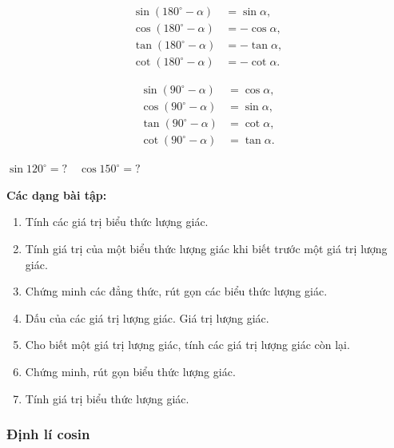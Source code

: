 \documentclass[12pt,a4paper]{article}
\begin{document}
\begin{congthuc}[title={Góc bù nhau (sin - bù)}]
  \begin{align*}
    \sin(180^\circ - \alpha) &= \sin\alpha, \\
    \cos(180^\circ - \alpha) &= -\cos\alpha, \\
    \tan(180^\circ - \alpha) &= -\tan\alpha, \\
    \cot(180^\circ - \alpha) &= -\cot\alpha.
  \end{align*}
\end{congthuc}

\begin{congthuc}[title={Góc phụ nhau (phụ chéo)}]
  \begin{align*}
    \sin(90^\circ - \alpha) &= \cos\alpha, \\
    \cos(90^\circ - \alpha) &= \sin\alpha, \\
    \tan(90^\circ - \alpha) &= \cot\alpha, \\
    \cot(90^\circ - \alpha) &= \tan\alpha.
  \end{align*}
\end{congthuc}

\begin{vidu}
  $\sin 120^\circ = ?\quad \cos 150^\circ = ?$
\end{vidu}

\medskip\noindent\textbf{Các dạng bài tập:}
\begin{enumerate}[label=\textbf{Dạng \arabic*:}, leftmargin=*, align=left]
  \item Tính các giá trị biểu thức lượng giác.
  \item Tính giá trị của một biểu thức lượng giác khi biết trước một giá trị lượng giác.
  \item Chứng minh các đẳng thức, rút gọn các biểu thức lượng giác.
  \item Dấu của các giá trị lượng giác. Giá trị lượng giác.
  \item Cho biết một giá trị lượng giác, tính các giá trị lượng giác còn lại.
  \item Chứng minh, rút gọn biểu thức lượng giác.
  \item Tính giá trị biểu thức lượng giác.
\end{enumerate}

\subsubsection{Định lí cosin}
\end{document}
